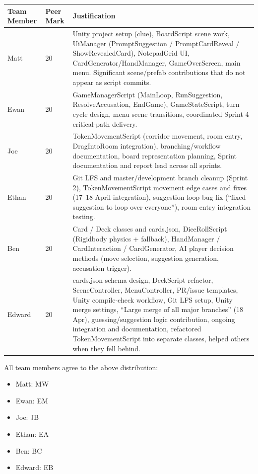 \begin{longtable}{llp{9cm}}
\toprule
\textbf{Team Member} & \textbf{Peer Mark} & \textbf{Justification} \\
\midrule
\endhead
Matt & 20 & Unity project setup (clue), BoardScript scene work, UiManager (PromptSuggestion / PromptCardReveal / ShowRevealedCard), NotepadGrid UI, CardGenerator/HandManager, GameOverScreen, main menu. Significant scene/prefab contributions that do not appear as script commits. \\
Ewan & 20 & GameManagerScript (MainLoop, RunSuggestion, ResolveAccusation, EndGame), GameStateScript, turn cycle design, menu scene transitions, coordinated Sprint 4 critical-path delivery. \\
Joe & 20 & TokenMovementScript (corridor movement, room entry, DragIntoRoom integration), branching/workflow documentation, board representation planning, Sprint documentation and report lead across all sprints. \\
Ethan & 20 & Git LFS and master/development branch cleanup (Sprint 2), TokenMovementScript movement edge cases and fixes (17--18 April integration), suggestion loop bug fix (``fixed suggestion to loop over everyone''), room entry integration testing. \\
Ben & 20 & Card / Deck classes and cards.json, DiceRollScript (Rigidbody physics + fallback), HandManager / CardInteraction / CardGenerator, AI player decision methods (move selection, suggestion generation, accusation trigger). \\
Edward & 20 & cards.json schema design, DeckScript refactor, SceneController, MenuController, PR/issue templates, Unity compile-check workflow, Git LFS setup, Unity merge settings, ``Large merge of all major branches'' (18 Apr), guessing/suggestion logic contribution, ongoing integration and documentation, refactored TokenMovementScript into separate classes, helped others when they fell behind. \\
\bottomrule
\end{longtable}

\noindent All team members agree to the above distribution:
\begin{itemize}
    \item Matt: MW
    \item Ewan: EM
    \item Joe: JB
    \item Ethan: EA
    \item Ben: BC
    \item Edward: EB
\end{itemize}

